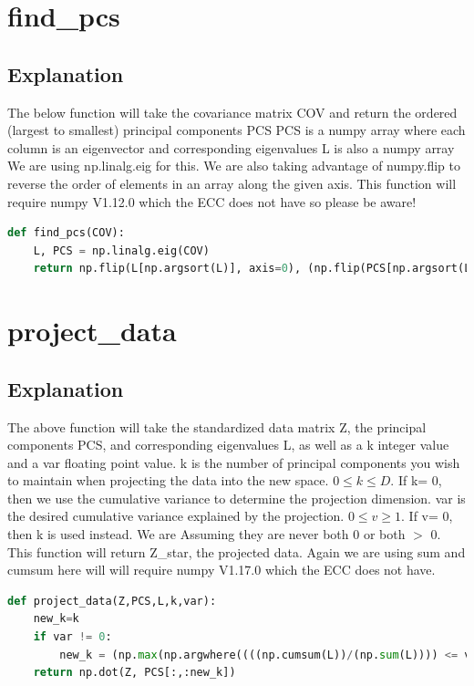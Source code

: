 \documentclass{article}
\begin{document}
\section{find\_pcs}
\subsection{Explanation}
The below function will take the covariance matrix COV and return the ordered (largest to smallest) principal components PCS
PCS is a numpy array where each column is an eigenvector and corresponding eigenvalues L is also a numpy array
We are using np.linalg.eig for this. We are also taking advantage of numpy.flip to reverse the order of elements in an array along the given axis. This function will require numpy V1.12.0 which the ECC does not have so please be aware!

\begin{lstlisting}[language=Python]
def find_pcs(COV):
	L, PCS = np.linalg.eig(COV)
	return np.flip(L[np.argsort(L)], axis=0), (np.flip(PCS[np.argsort(L)], axis=0)).transpose()
\end{lstlisting}

\section{project\_data}
\subsection{Explanation}
The above function will take the standardized data matrix Z, the principal components PCS, and corresponding eigenvalues L,
as well as a k integer value and a var ﬂoating point value. k is the number of principal components you wish to maintain
when projecting the data into the new space. $0 \leq  k \leq  D$. If k= 0, then we use the cumulative variance to determine the projection dimension.
var is the desired cumulative variance explained by the projection. $0 \leq  v \geq  1$.
If v= 0, then k is used instead. We are Assuming they are never both 0 or both $>$ 0. This function will return Z\_star, the projected data. Again we are using sum and cumsum here will will require numpy V1.17.0 which the ECC does not have.

\begin{lstlisting}[language=Python]
def project_data(Z,PCS,L,k,var):
	new_k=k
	if var != 0:
		new_k = (np.max(np.argwhere((((np.cumsum(L))/(np.sum(L)))) <= var)))
	return np.dot(Z, PCS[:,:new_k])
\end{lstlisting}
\end{document}
